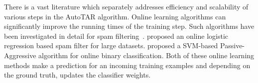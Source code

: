 There is a vast literature which separately addresses efficiency and scalability
of various steps in the AutoTAR algorithm. Online learning algorithms can
significantly improve the running times of the training step. Such algorithms
have been investigated in detail for spam
filtering~\cite{sculley2007relaxed,cormack2007online,sculley2007online}.
\citet{cormack2011efficient} proposed an online logistic regression based spam filter for large
datasets. \citet{crammer2006online} proposed a SVM-based
Passive-Aggressive algorithm for online binary
classification. Both of these online learning methods
make a prediction for an incoming training examples and depending on the ground
truth, updates the classifier weights.

